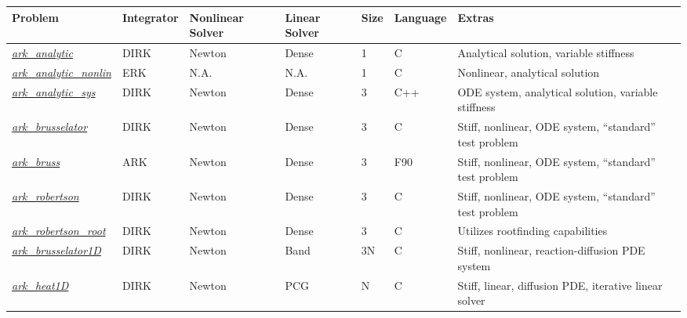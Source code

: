 \documentclass[letterpaper,10pt,english]{sphinxmanual}
\begin{document}
\begin{tabulary}{\linewidth}{|L|L|L|L|L|L|L|}
\hline
\textbf{\relax 
Problem
} & \textbf{\relax 
Integrator
} & \textbf{\relax 
Nonlinear Solver
} & \textbf{\relax 
Linear Solver
} & \textbf{\relax 
Size
} & \textbf{\relax 
Language
} & \textbf{\relax 
Extras
}\\\hline

{\hyperref[ark_analytic:ark-analytic]{\emph{ark\_analytic}}}
 & 
DIRK
 & 
Newton
 & 
Dense
 & 
1
 & 
C
 & 
Analytical solution, variable stiffness
\\\hline

{\hyperref[ark_analytic_nonlin:ark-analytic-nonlin]{\emph{ark\_analytic\_nonlin}}}
 & 
ERK
 & 
N.A.
 & 
N.A.
 & 
1
 & 
C
 & 
Nonlinear, analytical solution
\\\hline

{\hyperref[ark_analytic_sys:ark-analytic-sys]{\emph{ark\_analytic\_sys}}}
 & 
DIRK
 & 
Newton
 & 
Dense
 & 
3
 & 
C++
 & 
ODE system, analytical solution, variable stiffness
\\\hline

{\hyperref[ark_brusselator:ark-brusselator]{\emph{ark\_brusselator}}}
 & 
DIRK
 & 
Newton
 & 
Dense
 & 
3
 & 
C
 & 
Stiff, nonlinear, ODE system, ``standard'' test problem
\\\hline

{\hyperref[ark_bruss:ark-bruss]{\emph{ark\_bruss}}}
 & 
ARK
 & 
Newton
 & 
Dense
 & 
3
 & 
F90
 & 
Stiff, nonlinear, ODE system, ``standard'' test problem
\\\hline

{\hyperref[ark_robertson:ark-robertson]{\emph{ark\_robertson}}}
 & 
DIRK
 & 
Newton
 & 
Dense
 & 
3
 & 
C
 & 
Stiff, nonlinear, ODE system, ``standard'' test problem
\\\hline

{\hyperref[ark_robertson_root:ark-robertson-root]{\emph{ark\_robertson\_root}}}
 & 
DIRK
 & 
Newton
 & 
Dense
 & 
3
 & 
C
 & 
Utilizes rootfinding capabilities
\\\hline

{\hyperref[ark_brusselator1D:ark-brusselator1d]{\emph{ark\_brusselator1D}}}
 & 
DIRK
 & 
Newton
 & 
Band
 & 
3N
 & 
C
 & 
Stiff, nonlinear, reaction-diffusion PDE system
\\\hline

{\hyperref[ark_heat1D:ark-heat1d]{\emph{ark\_heat1D}}}
 & 
DIRK
 & 
Newton
 & 
PCG
 & 
N
 & 
C
 & 
Stiff, linear, diffusion PDE, iterative linear solver
\\\hline


\end{tabulary}
\end{document}
